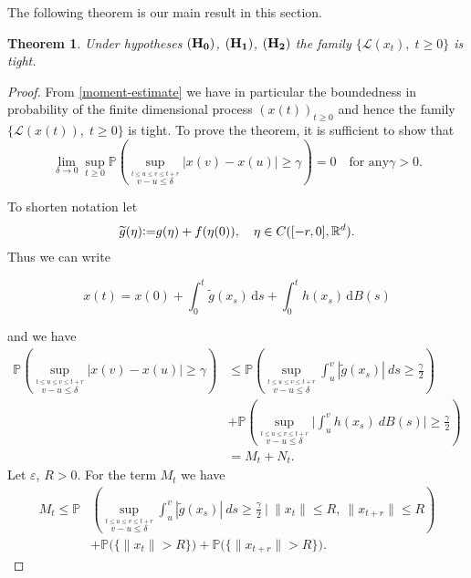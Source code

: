 \documentclass[11pt,reqno,draft]{amsart}
\newtheorem{theorem}[defi]{Theorem}
\begin{document}
\noindent The following theorem is our main result in this section.

\begin{theorem}
Under hypotheses ${\bf(H_0)}$, ${\bf(H_1)}$,  ${\bf(H_2)}$ the
family $\{\mathcal{L}(x_t),\; t\geq 0\}$ is tight.
\end{theorem}

\begin{proof}
 From
\eqref{moment-estimate} we have in particular the boundedness in
probability of the finite dimensional process $(x(t))_{t\geq 0}$ and
hence the family $\{\mathcal{L}(x(t)),\; t\geq 0\}$ is tight. To
prove the theorem, it is sufficient to show that
\begin{equation}\label{hoelder}
\lim\limits_{\delta\to 0}\sup\limits_{t\geq 0}{\mathbb P}\left(
\sup\limits_{{\stackrel{t\leq u\leq v\leq t+r}{v-u\leq
\delta}}}|x(v)-x(u)|\geq \gamma\right)=0\quad \mbox{for any
$\gamma>0$}.
\end{equation}

\noindent To shorten notation let
$$
{\widetilde{g}}(\eta){\mathrel{\mathrm{\raise0.1ex\hbox{:}\hbox{=}\strut}}} g(\eta)+f(\eta(0)),\quad \eta\in C([-r,0],{\mathbb R}^d).
$$
\noindent Thus we can write

$$
x(t)=x(0)+\int_0^t {\widetilde{g}}(x_s)\,\mathrm{d}s + \int_0^t
h(x_s)\,\mathrm{d}B(s)
$$

\noindent and we have
\begin{equation}
\begin{split}
{\mathbb P}\left( \sup\limits_{{\stackrel{t\leq u\leq v\leq t+r}{v-u\leq
\delta}}}|x(v)-x(u)|\geq \gamma\right)&\leq {\mathbb P}\left(
\sup\limits_{{\stackrel{t\leq u\leq v\leq t+r}{v-u\leq
\delta}}}\int_u^v|{\widetilde{g}}(x_s)|\:ds\geq \frac\gamma 2\right)\\&+{\mathbb P}\left(
\sup\limits_{{\stackrel{t\leq u\leq v\leq t+r}{v-u\leq
\delta}}}\Big|\int_u^v h(x_s)\:dB(s)\Big|\geq \frac\gamma 2\right)\\
&=M_t+N_t.
\end{split}
\end{equation}
\noindent Let ${\varepsilon}$, $R>0$. For the term $M_t$ we have
\begin{equation*}
\begin{split}
M_t\leq  {\mathbb P}&\left( \sup\limits_{{\stackrel{t\leq u\leq v\leq
t+r}{v-u\leq \delta}}}\int_u^v|{\widetilde{g}}(x_s)|\:ds\geq \frac\gamma 2
\:\Big|\:\|x_t\|\leq R,\:\|x_{t+r}\|\leq R \right)\\&+{\mathbb P}\Big(\{
\|x_t\|>R\}\Big)+{\mathbb P}\Big(\{ \|x_{t+r}\|>R\}\Big).
\end{split}
\end{equation*}


\end{proof}
\end{document}
